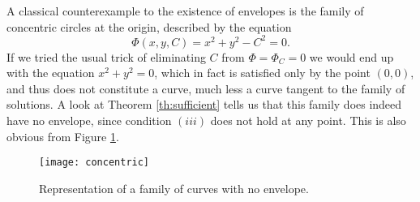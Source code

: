 \begin{example} A classical counterexample to the existence of envelopes is the family of concentric circles at the origin, described by the equation
  \[
  \Phi(x,y,C)=x^2+y^2 -C^2 =0.
  \]
If we tried the usual trick of eliminating $C$ from $\Phi=\Phi_C=0$ we would end up with the equation $x^2+y^2=0$, which in fact is satisfied only by the point $(0,0)$, and thus does not constitute a curve, much less a curve tangent to the family of solutions. A look at Theorem \ref{th:sufficient} tells us that this family does indeed have no envelope, since condition $(iii)$ does not hold at any point. This is also obvious from Figure \ref{fig:concentric}.
\begin{figure}[h!]
\centering
\texttt{[image: concentric]}
\caption{Representation of a family of curves with no envelope.}
\label{fig:concentric}
\end{figure}
\end{example}
